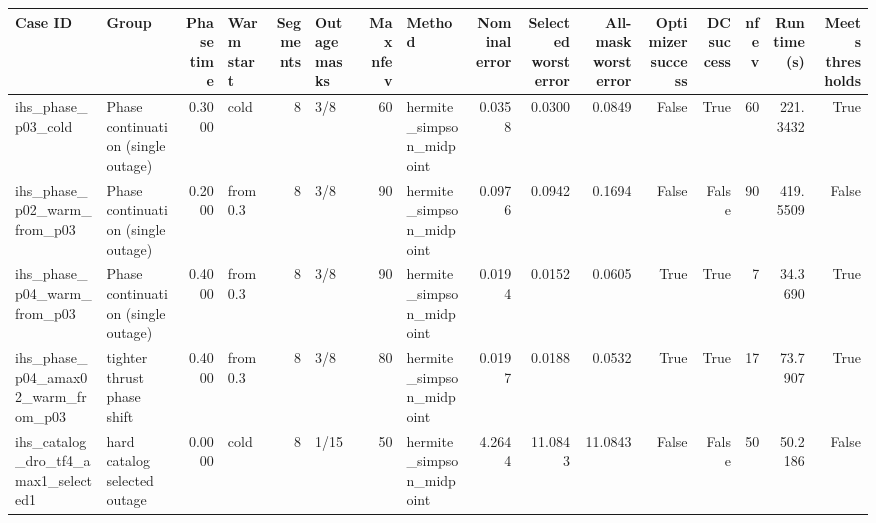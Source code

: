 \begin{tabular}{llrlrlrlrrrrrrrr}
\toprule
Case ID & Group & Phase time & Warm start & Segments & Outage masks & Max nfev & Method & Nominal error & Selected worst error & All-mask worst error & Optimizer success & DC success & nfev & Runtime (s) & Meets thresholds \\
\midrule
ihs\_phase\_p03\_cold & Phase continuation (single outage) & 0.3000 & cold & 8 & 3/8 & 60 & hermite\_simpson\_midpoint & 0.0358 & 0.0300 & 0.0849 & False & True & 60 & 221.3432 & True \\
ihs\_phase\_p02\_warm\_from\_p03 & Phase continuation (single outage) & 0.2000 & from 0.3 & 8 & 3/8 & 90 & hermite\_simpson\_midpoint & 0.0976 & 0.0942 & 0.1694 & False & False & 90 & 419.5509 & False \\
ihs\_phase\_p04\_warm\_from\_p03 & Phase continuation (single outage) & 0.4000 & from 0.3 & 8 & 3/8 & 90 & hermite\_simpson\_midpoint & 0.0194 & 0.0152 & 0.0605 & True & True & 7 & 34.3690 & True \\
ihs\_phase\_p04\_amax02\_warm\_from\_p03 & tighter thrust phase shift & 0.4000 & from 0.3 & 8 & 3/8 & 80 & hermite\_simpson\_midpoint & 0.0197 & 0.0188 & 0.0532 & True & True & 17 & 73.7907 & True \\
ihs\_catalog\_dro\_tf4\_amax1\_selected1 & hard catalog selected outage & 0.0000 & cold & 8 & 1/15 & 50 & hermite\_simpson\_midpoint & 4.2644 & 11.0843 & 11.0843 & False & False & 50 & 50.2186 & False \\
\bottomrule
\end{tabular}
